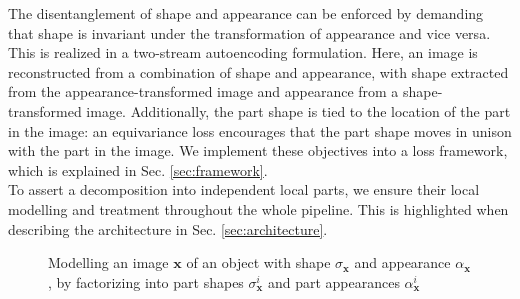 	The disentanglement of shape and appearance can be enforced by demanding that shape is invariant under the transformation of appearance and vice versa. This is realized in a two-stream autoencoding formulation. Here, an image is reconstructed from a combination of shape and appearance, with shape extracted from the appearance-transformed image and appearance from a shape-transformed image. Additionally, the part shape is tied to the location of the part in the image: an equivariance loss encourages that the part shape moves in unison with the part in the image. We implement these objectives into a loss framework, which is explained in Sec. \ref{sec:framework}. \\
	To assert a decomposition into independent local parts, we ensure their local modelling and treatment throughout the whole pipeline. This is highlighted when describing the architecture in Sec. \ref{sec:architecture}.

	\begin{figure}[htp]
		\centering
		
		\caption{Modelling an image $\mathbf{x}$ of an object with shape ${\sigma}_{\mathbf{x}}$ and appearance $\alpha_{\mathbf{x}}$, by factorizing into part shapes ${{\sigma}}^i_{\mathbf{x}}$ and part appearances ${\alpha}^i_{\mathbf{x}}$}
		\label{fig:representation}
	\end{figure}

